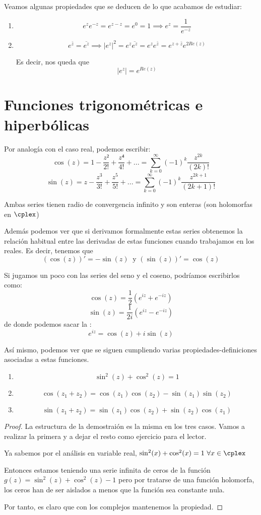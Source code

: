 \documentclass{apuntes}
\begin{document}
Veamos algunas propiedades que se deducen de lo que acabamos de estudiar:
\begin{enumerate}
\item \[e^ze^{-z}=e^{z-z}=e^0=1 \implies e^z=\frac{1}{e^{-z}}\]
\item \[e^{\bar{z}}=\overline{e^z} \implies |e^z|^2=e^z\overline{e^z} = e^z e^{\bar{z}}=e^{z+\bar{z}} e^{2 Re(z)}\]

Es decir, nos queda que
\[|e^z|=e^{Re(z)}\]
\end{enumerate}


\section{Funciones trigonométricas e hiperbólicas}
Por analogía con el caso real, podemos escribir:
\[\cos(z)=1-\frac{z²}{2!}+\frac{z⁴}{4!}+... = \sum_{k=0}^{\infty}(-1)^k\frac{z^{2k}}{(2k)!}\]
\[\sin(z)=z-\frac{z^3}{3!}+\frac{z^5}{5!}+... = \sum_{k=0}^{\infty}(-1)^k\frac{z^{2k+1}}{(2k+1)!}\]

Ambas series tienen radio de convergencia infinito y son enteras (son holomorfas en $\cplex$)

Además podemos ver que si derivamos formalmente estas series obtenemos la relación habitual entre las derivadas de estas funciones cuando trabajamos en los reales. Es decir, tenemos que
\[(\cos(z))'=-\sin(z) \ \text{ y } (\sin(z))'=\cos(z)\]

Si jugamos un poco con las series del seno y el coseno, podríamos escribirlos como:
\[\cos(z)=\frac{1}{2}\left( e^{iz}+e^{-iz}\right)\]
\[\sin(z)=\frac{1}{2i}\left( e^{iz}-e^{-iz}\right)\]
de donde podemos sacar la :
\[e^{iz}=\cos(z)+i\sin(z)\]

Así mismo, podemos ver que se siguen cumpliendo varias propiedades-definiciones asociadas a estas funciones.
\begin{enumerate}
\item
\[\sin^2(z)+\cos^2(z) =1\]
\item
\[\cos(z_1+z_2)=\cos(z_1)\cos(z_2)-\sin(z_1)\sin(z_2)\]
\item
\[\sin(z_1+z_2)=\sin(z_1)\cos(z_2)+\sin(z_2)\cos(z_1)\]
\end{enumerate}
\begin{proof}
La estructura de la demostraión es la misma en los tres casos. Vamos a realizar la primera y a dejar el resto como ejercicio para el lector.

Ya sabemos por el análisis en variable real, $\sin^2(x)+\cos^2(x)=1 \ \forall x \in \cplex$

Entonces estamos teniendo una serie infinita de ceros de la función
$g(z)=\sin^2(z)+\cos^2(z)-1$
pero por tratarse de una función holomorfa, los ceros han de ser aislados a menos que la función sea constante nula.

Por tanto, es claro que con los complejos mantenemos la propiedad.
\end{proof}
\end{document}

